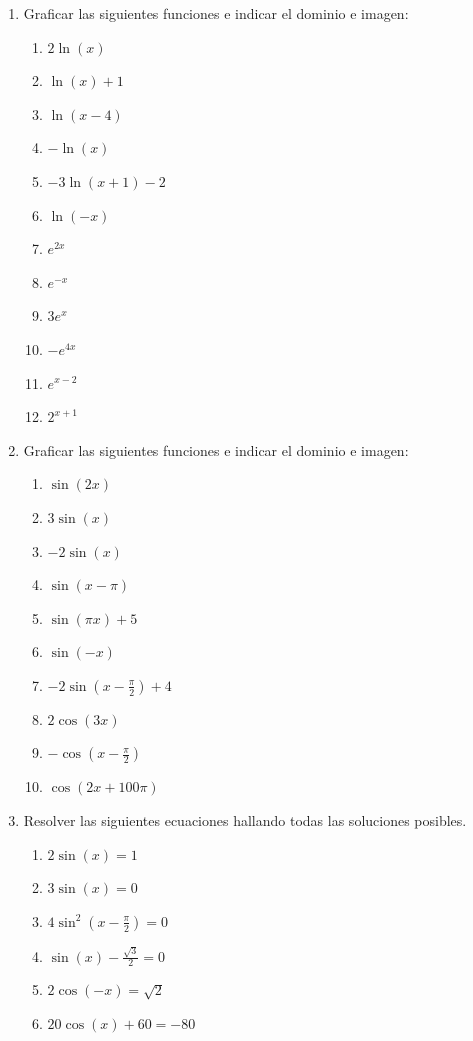 \documentclass[a4paper]{article}
\newcommand{\exercise}{\item}
\begin{document}
\begin{enumerate}
	\exercise Graficar las siguientes funciones e indicar el dominio e imagen:
	\begin{enumerate} [label=(\alph*)]
		\item $2\ln(x)$
		\item $\ln(x)+1$
		\item $\ln(x-4)$
		\item $-\ln(x)$
		\item $-3\ln(x+1)-2$
		\item $\ln(-x)$
		\item $e^{2x}$
		\item $e^{-x}$
		\item $3e^{x}$
		\item $-e^{4x}$
		\item $e^{x-2}$
		\item $2^{x+1}$
	\end{enumerate}

	\exercise Graficar las siguientes funciones e indicar el dominio e imagen:
	\begin{enumerate} [label=(\alph*)]
		\item $\sin(2x)$
		\item $3\sin(x)$
		\item $-2\sin(x)$
		\item $\sin(x-\pi)$
		\item $\sin(\pi x)+5$
		\item $\sin(-x)$
		\item $-2\sin\left(x-\frac{\pi}{2}\right)+4$
		\item $2\cos(3x)$
		\item $-\cos\left(x-\frac{\pi}{2}\right)$
		\item $\cos(2x+100\pi)$
	\end{enumerate}

	\exercise Resolver las siguientes ecuaciones hallando todas las soluciones posibles.
	\begin{enumerate} [label=(\alph*)]
		\item $2\sin(x)=1$
		\item $3\sin(x)=0$
		\item $4\sin^{2}\left(x-\frac{\pi}{2}\right)=0$
		\item $\sin(x)-\frac{\sqrt{3}}{2}=0$
		\item $2\cos(-x)=\sqrt{2}$
		\item $20\cos(x)+60=-80$
	\end{enumerate}


\end{enumerate}
\end{document}
